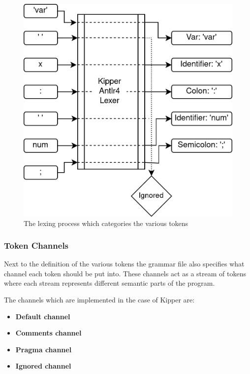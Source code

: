 \begin{figure}[h!]
	\centering
	\def\stackalignment{r}
	\includegraphics[scale=1]{./pics/Lexer-Algorithm.drawio}
	\caption{The lexing process which categories the various tokens}
	\label{fig:implementation:Lexer-Algorithm}
\end{figure}

\subsubsection{Token Channels}
\label{sec:token-channels}

Next to the definition of the various tokens the grammar file also specifies what channel each token should be put into. These channels act as a stream of tokens where each stream represents different semantic parts of the program.

The channels which are implemented in the case of Kipper are:

\begin{itemize}
	\item \textbf{Default channel}
	\item \textbf{Comments channel}
	\item \textbf{Pragma channel}
	\item \textbf{Ignored channel}
\end{itemize}

